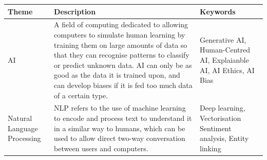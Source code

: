 \documentclass[12pt]{report}
\begin{document}
\pagebreak
    \begin{table}[H]
        \centering
        \begin{tabular}{|p{}|p{} | p{}|}
            \hline
            \cellcolor{blue!25}Theme & \cellcolor{blue!25}Description &
            \cellcolor{blue!25}Keywords \\

            \hline

            AI & A field of computing dedicated to allowing computers to simulate human
            learning by training them on large amounts of data so that they can recognise patterns to classify or 
            predict unknown data. AI can only be as good as the data it is trained upon, and can 
            develop biases if it is fed too much data of a certain type. & Generative AI, 
            Human-Centred AI, Explaianble AI, AI Ethics, AI Bias \\



            \hline

            Natural Language Processing & NLP refers to the use of machine learning to encode and 
            process text to understand it in a similar way to humans, which can be used to allow direct 
            two-way conversation between users and computers. & Deep learning, Vectorisation
            Sentiment analysis, Entity linking


\end{tabular}
\end{table}
\end{document}
